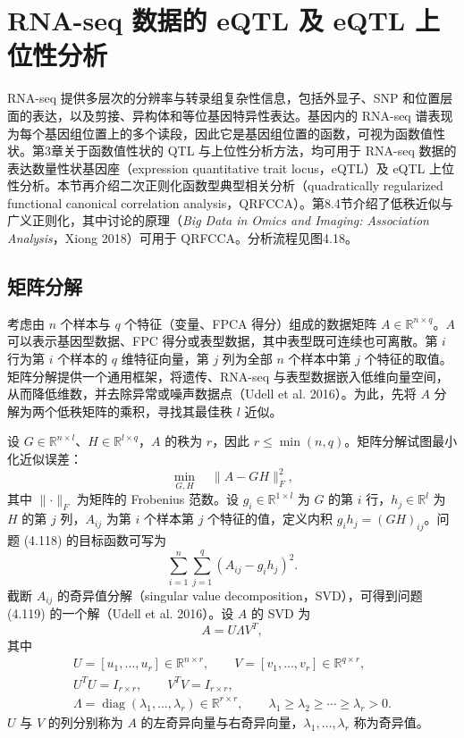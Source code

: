 \section{RNA-seq 数据的 eQTL 及 eQTL 上位性分析}

RNA-seq 提供多层次的分辨率与转录组复杂性信息，包括外显子、SNP 和位置层面的表达，以及剪接、异构体和等位基因特异性表达。基因内的 RNA-seq 谱表现为每个基因组位置上的多个读段，因此它是基因组位置的函数，可视为函数值性状。第3章关于函数值性状的 QTL 与上位性分析方法，均可用于 RNA-seq 数据的表达数量性状基因座（expression quantitative trait locus，eQTL）及 eQTL 上位性分析。本节再介绍二次正则化函数型典型相关分析（quadratically regularized functional canonical correlation analysis，QRFCCA）。第8.4节介绍了低秩近似与广义正则化，其中讨论的原理（\textit{Big Data in Omics and Imaging: Association Analysis}，Xiong 2018）可用于 QRFCCA。分析流程见图4.18。


\subsection{矩阵分解}
考虑由 $n$ 个样本与 $q$ 个特征（变量、FPCA 得分）组成的数据矩阵 $A\in\mathbb R^{n\times q}$。$A$ 可以表示基因型数据、FPC 得分或表型数据，其中表型既可连续也可离散。第 $i$ 行为第 $i$ 个样本的 $q$ 维特征向量，第 $j$ 列为全部 $n$ 个样本中第 $j$ 个特征的取值。矩阵分解提供一个通用框架，将遗传、RNA-seq 与表型数据嵌入低维向量空间，从而降低维数，并去除异常或噪声数据点（Udell et al. 2016）。为此，先将 $A$ 分解为两个低秩矩阵的乘积，寻找其最佳秩 $l$ 近似。

设 $G\in\mathbb R^{n\times l}$、$H\in\mathbb R^{l\times q}$，$A$ 的秩为 $r$，因此 $r\le\min(n,q)$。矩阵分解试图最小化近似误差：
\begin{equation}
\min_{G,H}\quad\lVert A-GH\rVert_F^2,
\tag{4.119}
\end{equation}
其中 $\lVert\cdot\rVert_F$ 为矩阵的 Frobenius 范数。设 $g_i\in\mathbb R^{1\times l}$ 为 $G$ 的第 $i$ 行，$h_j\in\mathbb R^l$ 为 $H$ 的第 $j$ 列，$A_{ij}$ 为第 $i$ 个样本第 $j$ 个特征的值，定义内积 $g_ih_j=(GH)_{ij}$。问题 (4.118) 的目标函数可写为
\begin{equation}
\sum_{i=1}^{n}\sum_{j=1}^{q}(A_{ij}-g_ih_j)^2.
\tag{4.120}
\end{equation}
截断 $A_{ij}$ 的奇异值分解（singular value decomposition，SVD），可得到问题 (4.119) 的一个解（Udell et al. 2016）。设 $A$ 的 SVD 为
\begin{equation}
A=U\Lambda V^T,
\tag{4.121}
\end{equation}
其中
\[
\begin{gathered}
U=[u_1,\ldots,u_r]\in\mathbb R^{n\times r},\qquad
V=[v_1,\ldots,v_r]\in\mathbb R^{q\times r},\\
U^TU=I_{r\times r},\qquad V^TV=I_{r\times r},\\
\Lambda=\operatorname{diag}(\lambda_1,\ldots,\lambda_r)\in\mathbb R^{r\times r},\qquad
\lambda_1\ge\lambda_2\ge\cdots\ge\lambda_r>0.
\end{gathered}
\]
$U$ 与 $V$ 的列分别称为 $A$ 的左奇异向量与右奇异向量，$\lambda_1,\ldots,\lambda_r$ 称为奇异值。

